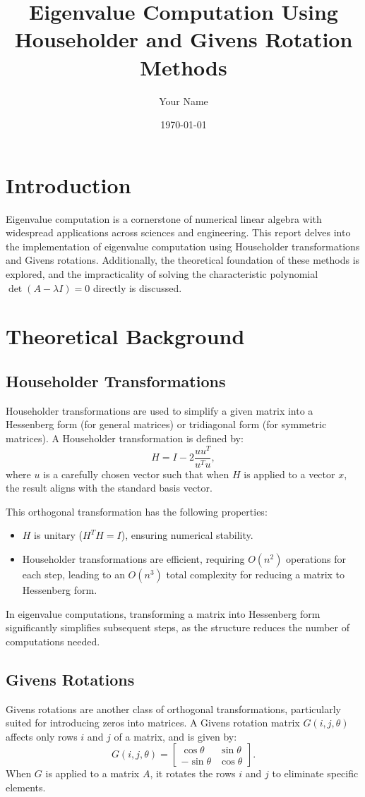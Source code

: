\documentclass[12pt]{article}
\title{Eigenvalue Computation Using Householder and Givens Rotation Methods}
\author{Your Name}
\date{\today}
\begin{document}
\maketitle

\section*{Introduction}
Eigenvalue computation is a cornerstone of numerical linear algebra with widespread applications across sciences and engineering. This report delves into the implementation of eigenvalue computation using Householder transformations and Givens rotations. Additionally, the theoretical foundation of these methods is explored, and the impracticality of solving the characteristic polynomial \( \det(A - \lambda I) = 0 \) directly is discussed.

\section*{Theoretical Background}

\subsection*{Householder Transformations}
Householder transformations are used to simplify a given matrix into a Hessenberg form (for general matrices) or tridiagonal form (for symmetric matrices). A Householder transformation is defined by:
\[
H = I - 2 \frac{u u^T}{u^T u},
\]
where \( u \) is a carefully chosen vector such that when \( H \) is applied to a vector \( x \), the result aligns with the standard basis vector. 

This orthogonal transformation has the following properties:
\begin{itemize}
    \item \( H \) is unitary (\( H^T H = I \)), ensuring numerical stability.
    \item Householder transformations are efficient, requiring \( O(n^2) \) operations for each step, leading to an \( O(n^3) \) total complexity for reducing a matrix to Hessenberg form.
\end{itemize}

In eigenvalue computations, transforming a matrix into Hessenberg form significantly simplifies subsequent steps, as the structure reduces the number of computations needed.

\subsection*{Givens Rotations}
Givens rotations are another class of orthogonal transformations, particularly suited for introducing zeros into matrices. A Givens rotation matrix \( G(i, j, \theta) \) affects only rows \( i \) and \( j \) of a matrix, and is given by:
\[
G(i, j, \theta) = 
\begin{bmatrix}
\cos\theta & \sin\theta \\
-\sin\theta & \cos\theta
\end{bmatrix}.
\]
When \( G \) is applied to a matrix \( A \), it rotates the rows \( i \) and \( j \) to eliminate specific elements.
\end{document}
